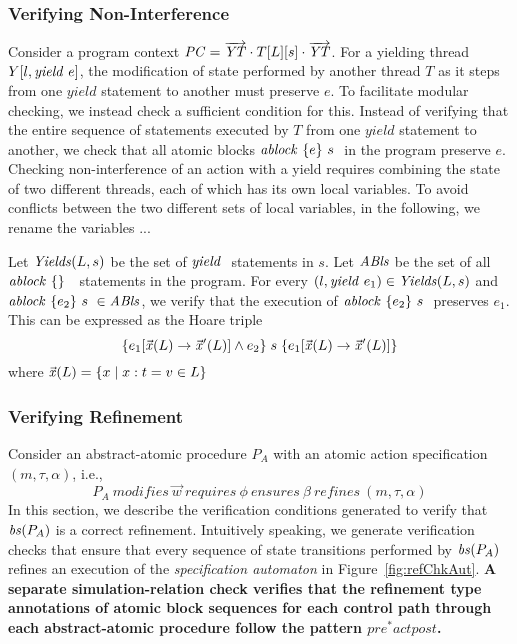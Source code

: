\subsubsection{Verifying Non-Interference}

Consider a program context $\mathit{PC} = \overrightarrow{\mathit{YT}} \cdot T[L][s] \cdot \overrightarrow{\mathit{YT}}$. For a yielding thread $Y[l, \mathit{yield}\ e]$, the modification of state performed by another thread $T$ as it steps from one $yield$ statement to another must preserve $e$. To facilitate modular checking, we instead check a sufficient condition for this. Instead of verifying that the entire sequence of statements executed by $T$ from one $yield$ statement to another, we check that all atomic blocks $\mathit{ablock}\ {\{e\}}\ {s}\ $ in the program preserve $e$. Checking non-interference of an action with a yield requires combining the state of two different threads, each of which has its own local variables. To avoid conflicts between the two different sets of local variables, in the following, we rename the variables ...  

Let $\mathit{Yields}(L,s)$ be the set of $\mathit{yield}\ $ statements in $s$. Let $\mathit{ABls}$ be the set of all $\mathit{ablock}\ {\{\}}\ {}\ $ statements in the program. For every $(l,\mathit{yield}\ e_1) \in \mathit{Yields}(L,s)$ and $\mathit{ablock}\ {\{e_2\}}\ {s}\  \in \mathit{ABls}$, we verify that the execution of $\mathit{ablock}\ {\{e_2\}}\ {s}\ $ preserves $e_1$.
This can be expressed as the Hoare triple 
$$\{ e_1[\vec{\mathit{x}}(L) \rightarrow \vec{\mathit{x}}'(L)] \wedge e_2 \} \; s \; \{ e_1[\vec{\mathit{x}}(L) \rightarrow \vec{\mathit{x}}'(L)] \}$$
where $\vec{\mathit{x}}(L) = \{x \mid x:t = v \in L\}$

\subsubsection{Verifying Refinement}
Consider an abstract-atomic procedure $P_{A}$ with an atomic action specification $(m, \tau, \alpha)$, i.e., $$P_{A}\ \mathit{modifies}\ \overrightarrow{w}\ \mathit{requires}\ \phi\ \mathit{ensures}\ \beta\ \mathit{refines}\ (m, \tau, \alpha)$$
In this section, we describe the verification conditions generated to verify that $\mathit{bs}(P_{A})$ is a correct refinement. Intuitively speaking, we generate verification checks that ensure that every sequence of state transitions performed by $\mathit{bs}(P_{A})$ refines an execution of the {\em specification automaton} in Figure~\ref{fig:refChkAut}. 
{\bf A separate simulation-relation check verifies that the refinement type annotations of atomic block sequences for each control path through each abstract-atomic procedure follow the pattern $\mathit{pre}^* \mathit{act} \mathit{post}$.}

